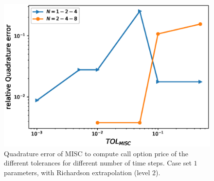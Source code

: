 \begin{figure}[h!]
	\centering
	\includegraphics[width=0.35\linewidth]{./figures/rBergomi_MISC_quadratre_error/vs_TOL/set2/relative_quad_error_wrt_MISC_TOL_set2_rich_level2_linear}
	
	
	\caption{Quadrature error of MISC to compute call option price of the different tolerances for different number of time steps. Case  set $1$ parameters, with Richardson extrapolation (level $2$).}
	\label{fig:Quadrature_error_set2_rich_linear}
\end{figure}


